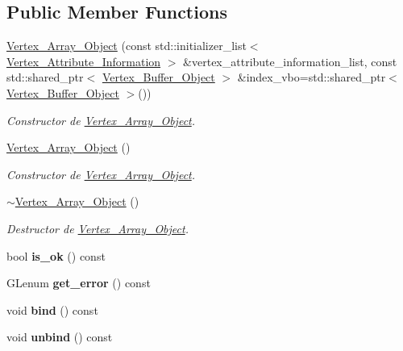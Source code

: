 \subsection*{Public Member Functions}
\begin{DoxyCompactItemize}
\item 
\mbox{\hyperlink{classexample_1_1_vertex___array___object_acc1cf052ffd4f1fe5e5302f0627d004e}{Vertex\+\_\+\+Array\+\_\+\+Object}} (const std\+::initializer\+\_\+list$<$ \mbox{\hyperlink{structexample_1_1_vertex___array___object_1_1_vertex___attribute___information}{Vertex\+\_\+\+Attribute\+\_\+\+Information}} $>$ \&vertex\+\_\+attribute\+\_\+information\+\_\+list, const std\+::shared\+\_\+ptr$<$ \mbox{\hyperlink{classexample_1_1_vertex___buffer___object}{Vertex\+\_\+\+Buffer\+\_\+\+Object}} $>$ \&index\+\_\+vbo=std\+::shared\+\_\+ptr$<$ \mbox{\hyperlink{classexample_1_1_vertex___buffer___object}{Vertex\+\_\+\+Buffer\+\_\+\+Object}} $>$())
\begin{DoxyCompactList}\small\item\em Constructor de \mbox{\hyperlink{classexample_1_1_vertex___array___object}{Vertex\+\_\+\+Array\+\_\+\+Object}}. \end{DoxyCompactList}\item 
\mbox{\hyperlink{classexample_1_1_vertex___array___object_a142c57794b128e840c341750dd79d8a9}{Vertex\+\_\+\+Array\+\_\+\+Object}} ()
\begin{DoxyCompactList}\small\item\em Constructor de \mbox{\hyperlink{classexample_1_1_vertex___array___object}{Vertex\+\_\+\+Array\+\_\+\+Object}}. \end{DoxyCompactList}\item 
\mbox{\hyperlink{classexample_1_1_vertex___array___object_a28b31b831260324b9bdf76e428ae0a4a}{$\sim$\+Vertex\+\_\+\+Array\+\_\+\+Object}} ()
\begin{DoxyCompactList}\small\item\em Destructor de \mbox{\hyperlink{classexample_1_1_vertex___array___object}{Vertex\+\_\+\+Array\+\_\+\+Object}}. \end{DoxyCompactList}\item 
\mbox{\label{classexample_1_1_vertex___array___object_a71775fce93cba7b6a234b43138f6fcce}} 
bool {\bfseries is\+\_\+ok} () const
\item 
\mbox{\label{classexample_1_1_vertex___array___object_a23d7e64dc9416b4ab91146de64aaff95}} 
G\+Lenum {\bfseries get\+\_\+error} () const
\item 
\mbox{\label{classexample_1_1_vertex___array___object_a18a463d4e733277edf22048828497b24}} 
void {\bfseries bind} () const
\item 
\mbox{\label{classexample_1_1_vertex___array___object_a10efc0a5ceb1a99d51b083d23a90aa0a}} 
void {\bfseries unbind} () const
\end{DoxyCompactItemize}


